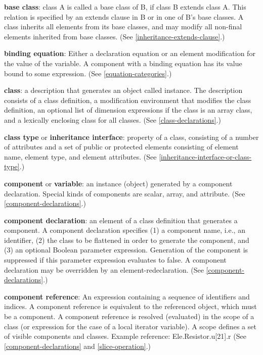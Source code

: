 \documentclass[../MLS.tex]{subfiles}
\begin{document}
\textbf{base class}: class A is called a base class of B, if class B
extends class A. This relation is specified by an extends clause in B or
in one of B's base classes. A class inherits all elements from its base
classes, and may modify all non-final elements inherited from base
classes. (See \autoref{inheritance-extends-clause}.)

\textbf{binding equation}: Either a declaration equation or an element
modification for the value of the variable. A component with a binding
equation has its value bound to some expression. (See \autoref{equation-categories}.)

\textbf{class}: a description that generates an object called instance.
The description consists of a class definition, a modification
environment that modifies the class definition, an optional list of
dimension expressions if the class is an array class, and a lexically
enclosing class for all classes. (See \autoref{class-declarations}.)

\textbf{class type} or \textbf{inheritance interface}: property of a
class, consisting of a number of attributes and a set of public or
protected elements consisting of element name, element type, and element
attributes. (See \autoref{inheritance-interface-or-class-type}.)

\textbf{component} or \textbf{variable}: an instance (object) generated
by a component declaration. Special kinds of components are scalar,
array, and attribute. (See \autoref{component-declarations}.)

\textbf{component declaration}: an element of a class definition that
generates a component. A component declaration specifies (1) a component
name, i.e., an identifier, (2) the class to be flattened in order to
generate the component, and (3) an optional Boolean parameter
expression. Generation of the component is suppressed if this parameter
expression evaluates to false. A component declaration may be overridden
by an element-redeclaration. (See \autoref{component-declarations}.)

\textbf{component reference}: An expression containing a sequence of
identifiers and indices. A component reference is equivalent to the
referenced object, which must be a component. A component reference is
resolved (evaluated) in the scope of a class (or expression for the case
of a local iterator variable). A scope defines a set of visible
  components and classes. Example reference: Ele.Resistor.u{[}21{]}.r (See
\autoref{component-declarations} and \autoref{slice-operation}.)
\end{document}
